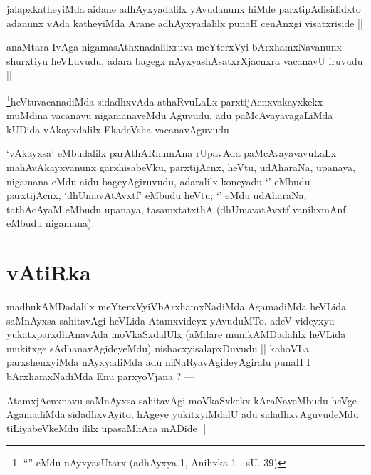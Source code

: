 \begin{artha}
jalapxkatheyiMda aidane adhAyxyadalilx yAvudanunx hiMde parxtipAdisididxto adanunx vAda katheyiMda Arane adhAyxyadalilx punaH cenAnxgi visatxriside ||
\end{artha}

\begin{artha}
anaMtara IvAga nigamasAthxnadalilxruva meYterxVyi bArxhamxNavanunx shurxtiyu heVLuvudu, adara bagegx nAyxyashAsatxrXjacnxra vacanavU iruvudu ||
\end{artha}


\begin{artha}
\footnote{``\stext'' eMdu nAyxyasUtarx (adhAyxya 1, Anihxka 1 - sU. 39)}heVtuvacanadiMda sidadhxvAda athaRvuLaLx parxtijAcnxvakayxkekx muMdina vacanavu nigamanaveMdu Aguvudu. adu paMcAvayavagaLiMda kUDida vAkayxdalilx EkadeVsha vacanavAguvudu |
\end{artha}


\begin{artha}
`vAkayxsa' eMbudalilx parAthARnumAna rUpavAda paMcAvayavavuLaLx mahAvAkayxvanunx garxhisabeVku, parxtijAcnx, heVtu, udAharaNa, upanaya, nigamana eMdu aidu bageyAgiruvudu, adaralilx koneyadu `\stext' eMbudu parxtijAcnx, `dhUmavAtAvxtf' eMbudu heVtu; `\stext' eMdu udAharaNa, tathAcAyaM eMbudu upanaya, tasamxtatxthA (dhUmavatAvxtf vanihxmAnf eMbudu nigamana).
\end{artha}

\section*{vAtiRka}


\begin{artha}
madhukAMDadalilx meYterxVyiVbArxhamxNadiMda AgamadiMda heVLida saMnAyxsa sahitavAgi heVLida Atamxvideyx yAvuduMTo. adeV videyxyu yukatxparxdhAnavAda moVkaSxdalUlx (aMdare munikAMDadalilx heVLida mukitxge sAdhanavAgideyeMdu) nishacxyisalapxDuvudu || kahoVLa parxshenxyiMda nAyxyadiMda adu niNaRyavAgideyAgiralu punaH I bArxhamxNadiMda Enu parxyoVjana ? ---
\end{artha}

\begin{artha}
AtamxjAcnxnavu saMnAyxsa sahitavAgi moVkaSxkekx kAraNaveMbudu heVge AgamadiMda sidadhxvAyito, hAgeye yukitxyiMdalU adu sidadhxvAguvudeMdu tiLiyabeVkeMdu ililx upasaMhAra mADide ||
\end{artha}

